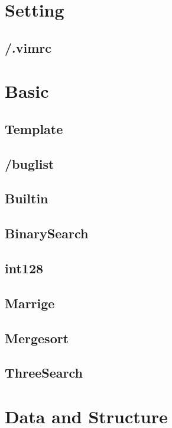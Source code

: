 \section{Setting}

\subsection{/.vimrc}


\section{Basic}

\subsection{Template}

\subsection{/buglist}

\subsection{Builtin}

\subsection{BinarySearch}

\subsection{int128}

\subsection{Marrige}

\subsection{Mergesort}

\subsection{ThreeSearch}


\section{Data and Structure}

